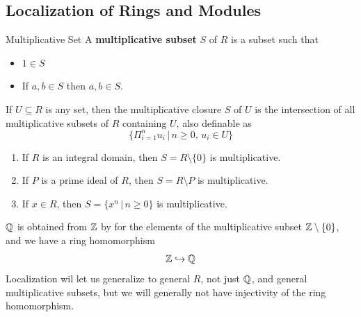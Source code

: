 \documentclass{article}
\begin{document}
\subsection{Localization of Rings and Modules}
\begin{fancydefine}{Multiplicative Set}
    A \textbf{multiplicative subset} $S$ of $R$ is a subset such that \begin{itemize}
        \item $1 \in S$
        \item If $a,b \in S$ then $a,b \in S$.
    \end{itemize}
    If $U \subseteq R$ is any set, then the multiplicative closure $S$ of $U$ is the intersection of all multiplicative subsets of $R$ containing $U$, also definable as \[ \{ \Pi_{i=1}^{n} u_{i} \,|\, n \geq 0, \, u_{i} \in U \} \]
\end{fancydefine}
\begin{exs}\hspace{0.1cm}
    \begin{enumerate}
        \item If $R$ is an integral domain, then $S = R \setminus \{0\}$ is multiplicative.
        \item If $P$ is a prime ideal of $R$, then $S = R \setminus P$ is multiplicative.
        \item If $x \in R$, then $S= \{ x^{n} \, | \, n \geq 0\}$ is multiplicative.
    \end{enumerate}
\end{exs}
\begin{ex}
    $\mathbb{Q}$ is obtained from $\mathbb{Z}$ by  for the elements of the multiplicative subset $\mathbb{Z} \setminus \{ 0 \}$, and we have a ring homomorphism \[ \mathbb{Z} \hookrightarrow \mathbb{Q}\]
    Localization wil let us generalize to general $R$, not just $\mathbb{Q}$, and general multiplicative subsets, but we will generally not have injectivity of the ring homomorphism.
\end{ex}
\end{document}
